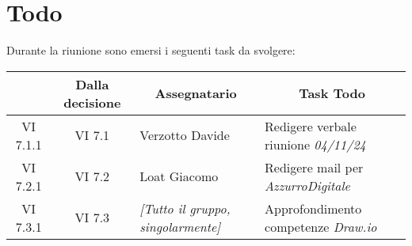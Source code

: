 

\section{Todo}

Durante la riunione sono emersi i seguenti task da svolgere:

\vspace{0.5cm}

\begin{table}[htbp]
\centering
\begin{tabular}{|c|c|p{}|p{}|}
    \hline
    \rowcolor[gray]{0.9}
    \multicolumn{1}{|c|}{\textbf{Codice}} & \multicolumn{1}{|c|}{\textbf{Dalla decisione}} & \multicolumn{1}{|c|}{\textbf{Assegnatario}} & \multicolumn{1}{|c|}{\textbf{Task Todo}} \\
    \hline
    VI 7.1.1 & VI 7.1 & Verzotto Davide & Redigere verbale riunione \emph{04/11/24} \\
    \hline
    VI 7.2.1 & VI 7.2 & Loat Giacomo & Redigere mail per \emph{AzzurroDigitale} \\
    \hline
    VI 7.3.1 & VI 7.3 & \emph{[Tutto il gruppo, singolarmente]} & Approfondimento competenze \emph{Draw.io} \\
    \hline
\end{tabular}
\end{table}
